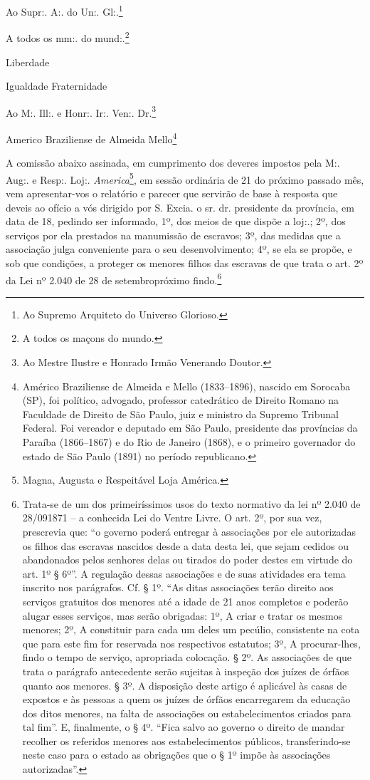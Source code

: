 {\asterisc{}

Ao Supr:. A:. do Un:. Gl:.\footnote{ Ao Supremo Arquiteto do Universo
  Glorioso.}

A todos os mm:. do mund:.\footnote{ A todos os maçons do mundo.}

Liberdade

Igualdade Fraternidade

Ao M:. Ill:. e Honr:. Ir:. Ven:. Dr.\footnote{ Ao Mestre Ilustre e
  Honrado Irmão Venerando Doutor.}

Americo Braziliense de Almeida Mello\footnote{ Américo Braziliense de
  Almeida e Mello (1833--1896), nascido em Sorocaba (SP), foi político,
  advogado, professor catedrático de Direito Romano na Faculdade de
  Direito de São Paulo, juiz e ministro da Supremo Tribunal Federal. Foi
  vereador e deputado em São Paulo, presidente das províncias da Paraíba
  (1866--1867) e do Rio de Janeiro (1868), e o primeiro governador do
  estado de São Paulo (1891) no período republicano.}

A comissão abaixo assinada, em cumprimento dos deveres impostos pela M:.
Aug:. e Resp:. Loj:. \emph{America}\footnote{ Magna, Augusta e
  Respeitável Loja América.}, em sessão ordinária de 21 do próximo
passado mês, vem apresentar-vos o relatório e parecer que servirão de
base à resposta que deveis ao ofício a vós dirigido por S. Excia. o sr.
dr. presidente da província, em data de 18, pedindo ser informado, 1º,
dos meios de que dispõe a loj:.; 2º, dos serviços por ela prestados na
manumissão de escravos; 3º, das medidas que a associação julga
conveniente para o seu desenvolvimento; 4º, se ela se propõe, e sob que
condições, a proteger os menores filhos das escravas de que trata o art.
2º da Lei nº 2.040 de 28 de setembropróximo findo.\footnote{ Trata-se
  de um dos primeiríssimos usos do texto normativo da lei nº 2.040 de
  28/091871 -- a conhecida Lei do Ventre Livre. O art. 2º, por sua vez,
  prescrevia que: ``o governo poderá entregar à associações por ele
  autorizadas os filhos das escravas nascidos desde a data desta lei,
  que sejam cedidos ou abandonados pelos senhores delas ou tirados do
  poder destes em virtude do art. 1º § 6º''. A regulação dessas
  associações e de suas atividades era tema inscrito nos parágrafos. Cf.
  § 1º. ``As ditas associações terão direito aos serviços gratuitos dos
  menores até a idade de 21 anos completos e poderão alugar esses
  serviços, mas serão obrigadas: 1º, A criar e tratar os mesmos menores;
  2º, A constituir para cada um deles um pecúlio, consistente na cota
  que para este fim for reservada nos respectivos estatutos; 3º, A
  procurar-lhes, findo o tempo de serviço, apropriada colocação. § 2º.
  As associações de que trata o parágrafo antecedente serão sujeitas à
  inspeção dos juízes de órfãos quanto aos menores. § 3º. A disposição
  deste artigo é aplicável às casas de expostos e às pessoas a quem os
  juízes de órfãos encarregarem da educação dos ditos menores, na falta
  de associações ou estabelecimentos criados para tal fim''. E,
  finalmente, o § 4º. ``Fica salvo ao governo o direito de mandar
  recolher os referidos menores aos estabelecimentos públicos,
  transferindo-se neste caso para o estado as obrigações que o § 1º
  impõe às associações autorizadas''.}

}
